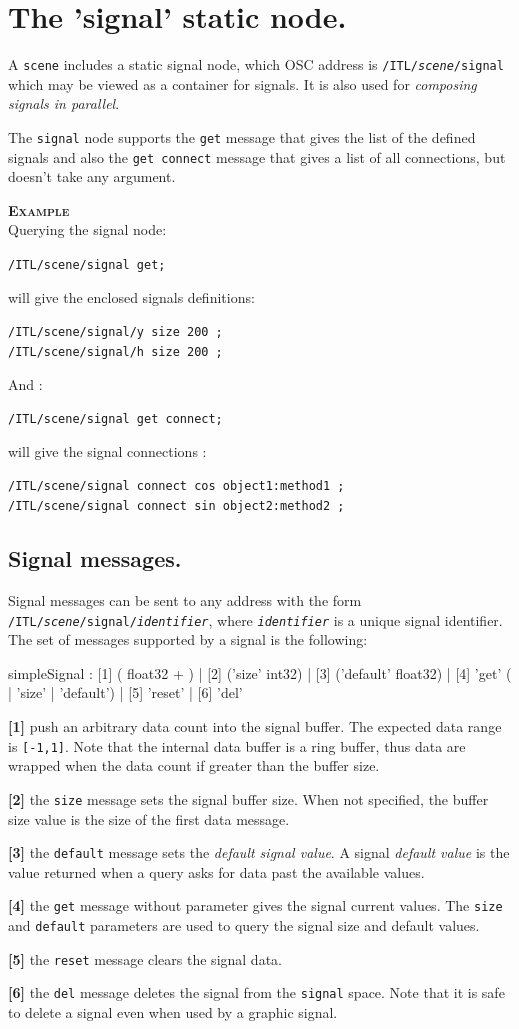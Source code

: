 \documentclass[a4paper,twoside]{report}
\newcommand{\sublevel}[1]	{\section{#1}}
\newcommand{\subsublevel}[1]	{\subsection{#1}}
\newcommand{\OSC}[1]		{\texttt{#1}}
\newcommand{\values}[1]		{\texttt{#1}}
\newcommand{\example}		{\textbf{\hspace{-1.5cm}\textbf{\textsc{Example }}}}
\let\olditemize\itemize
\let\oldenditemize\enditemize
\renewenvironment{itemize} 	{\olditemize \setlength{\itemsep}{1mm}}{\oldenditemize}
\newcommand{\sample}	[1]			{\vspace{-2mm}\begin{center}\colorbox{mygrey}{
								\begin{minipage}[t]{0.9\columnwidth} 
								{\small \texttt{#1}}
								\end{minipage}}\end{center}}
\newcommand{\sampleindent}	{ \hspace{0.5cm} }
\begin{document}
\sublevel{The 'signal' static node.}
A \OSC{scene} includes a static signal node, which OSC address is \OSC{/ITL/\textit{scene}/signal} which may be viewed as a container for signals. It is also used for \textit{composing signals in parallel}.

The \OSC{signal} node supports the \OSC{get} message that gives the list of the defined signals and also the \OSC{get connect} message that gives a list of all connections, but doesn't take any argument.

\example \\
Querying the signal node:
\sample{/ITL/scene/signal get;}
\sampleindent will give the enclosed signals definitions:
\sample{/ITL/scene/signal/y size 200 ;\\
/ITL/scene/signal/h size 200 ;
}

And :
\sample{/ITL/scene/signal get connect;}
\sampleindent will give the signal connections :
\sample{/ITL/scene/signal connect cos object1:method1 ;\\
/ITL/scene/signal connect sin object2:method2 ;
}


\subsublevel{Signal messages.}
\label{ssignal}
Signal messages can be sent to any address with the form \OSC{/ITL/\textit{scene}/signal/\textit{identifier}}, where \OSC{\textit{identifier}} is a unique signal identifier.
The set of messages supported by a signal is the following:
\begin{rail}
simpleSignal : [1] ( float32 + )
		| [2] ('size' int32) 
		| [3] ('default' float32)
		| [4] 'get' ( | 'size' | 'default')
		| [5] 'reset'
		| [6] 'del'
\end{rail}

\begin{itemize}
\item \textbf{[1]} push an arbitrary data count into the signal buffer. The expected data range is \values{[-1,1]}. Note that the internal data buffer is a ring buffer, thus data are wrapped when the data count if greater than the buffer size. 
\item \textbf{[2]} the \OSC{size} message sets the signal buffer size. When not specified, the buffer size value is the size of the first data message. 
\item \textbf{[3]} the \OSC{default} message sets the \emph{default signal value}. A signal \emph{default value} is the value returned when a query asks for data past the available values.
\item \textbf{[4]} the \OSC{get} message without parameter gives the signal current values. The \OSC{size} and  \OSC{default} parameters are used to query the signal size and default values.
\item \textbf{[5]} the \OSC{reset} message clears the signal data. 
\item \textbf{[6]} the \OSC{del} message deletes the signal from the \OSC{signal} space. Note that it is safe to delete a signal even when used by a graphic signal. 
\end{itemize}
\end{document}
